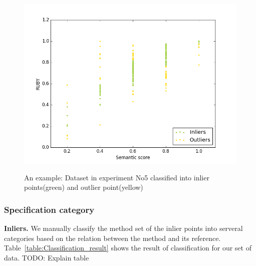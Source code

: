 \begin{figure}[t]
	\caption{An example: Dataset in experiment No5 classified into inlier points(green) and outlier point(yellow)}
	\includegraphics[scale=0.4]{img/inliers_outliers.png}
	\centering
	\label{fig:inliers_outliers}
\end{figure}

\subsubsection{Specification category}


\textbf{Inliers.} We manually classify the method set of the inlier points into serveral categories based on the relation between the method and its reference. Table~\ref{table:Classification_result} shows the result of classification for our set of data.
TODO: Explain table


